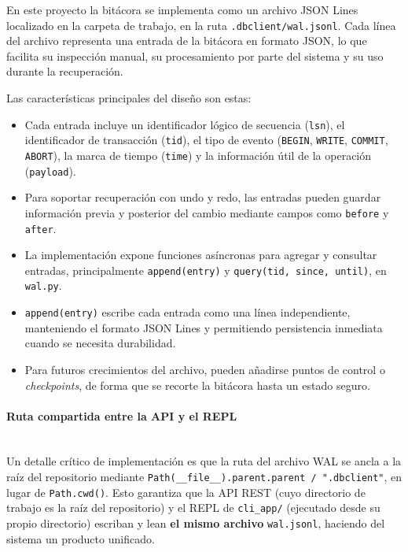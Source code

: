\documentclass[12pt,letterpaper]{article}
\begin{document}
En este proyecto la bitácora se implementa como un archivo JSON Lines localizado en la carpeta de trabajo, en la ruta \texttt{.dbclient/wal.jsonl}. Cada línea del archivo representa una entrada de la bitácora en formato JSON, lo que facilita su inspección manual, su procesamiento por parte del sistema y su uso durante la recuperación.

Las características principales del diseño son estas:

\begin{itemize}
  \item Cada entrada incluye un identificador lógico de secuencia (\texttt{lsn}), el identificador de transacción (\texttt{tid}), el tipo de evento (\texttt{BEGIN}, \texttt{WRITE}, \texttt{COMMIT}, \texttt{ABORT}), la marca de tiempo (\texttt{time}) y la información útil de la operación (\texttt{payload}).
  \item Para soportar recuperación con undo y redo, las entradas pueden guardar información previa y posterior del cambio mediante campos como \texttt{before} y \texttt{after}.
  \item La implementación expone funciones asíncronas para agregar y consultar entradas, principalmente \texttt{append(entry)} y \texttt{query(tid, since, until)}, en \texttt{wal.py}.
  \item \texttt{append(entry)} escribe cada entrada como una línea independiente, manteniendo el formato JSON Lines y permitiendo persistencia inmediata cuando se necesita durabilidad.
  \item Para futuros crecimientos del archivo, pueden añadirse puntos de control o \textit{checkpoints}, de forma que se recorte la bitácora hasta un estado seguro.
\end{itemize}

\paragraph{Ruta compartida entre la API y el REPL}\mbox{}\\

Un detalle crítico de implementación es que la ruta del archivo WAL se ancla a la
raíz del repositorio mediante \texttt{Path(\_\_file\_\_).parent.parent / ".dbclient"},
en lugar de \texttt{Path.cwd()}. Esto garantiza que la API REST (cuyo directorio de
trabajo es la raíz del repositorio) y el REPL de \texttt{cli\_app/} (ejecutado desde
su propio directorio) escriban y lean \textbf{el mismo archivo} \texttt{wal.jsonl},
haciendo del sistema un producto unificado.
\end{document}
